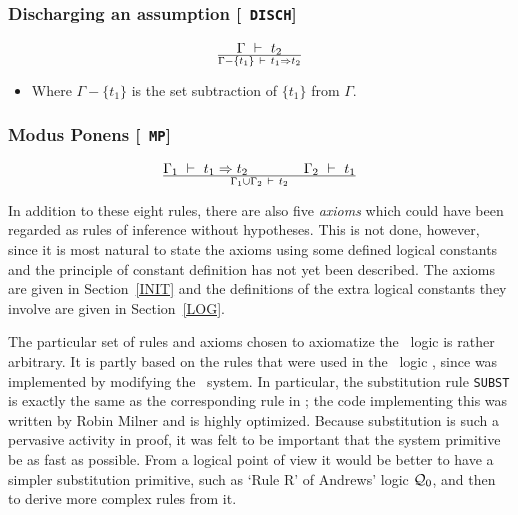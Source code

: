 \subsubsection*{Discharging an assumption [{\small\tt
DISCH}]}
\[
\Gamma\ \vdash\  t_2
\over
\Gamma -\{t_1\} \ \vdash\  t_1 \Rightarrow t_2
\]
\begin{itemize}
\item Where $\Gamma -\{t_1\}$ is the set subtraction of $\{t_1\}$
from $\Gamma$.
\end{itemize}

\subsubsection*{Modus Ponens [{\small\tt
MP}]}
\[
\Gamma_1 \ \vdash\  t_1 \Rightarrow t_2  \qquad\qquad   \Gamma_2\ \vdash\  t_1
\over
\Gamma_1 \cup \Gamma_2 \ \vdash\  t_2
\]

In addition to these eight rules, there are also five {\it
axioms\/} which could have been
regarded as rules of inference without hypotheses. This is not done,
however, since it is most natural to state the axioms using some
defined logical constants and the principle of constant definition has
not yet been described.  The axioms are given in Section~\ref{INIT} and
the definitions of the extra logical constants they involve are given in
Section~\ref{LOG}.

The particular set of rules and axioms chosen to axiomatize the \HOL\
logic is rather arbitrary. It is partly based on the rules that were
used in the
\LCF{}\ logic
\PPL{}, since \HOL{} was
implemented by modifying the \LCF\ system. In particular, the
substitution rule {\small\tt SUBST} is exactly
the same as the corresponding rule in \LCF; the code implementing this
was written by Robin Milner and is highly optimized. Because
substitution is such a pervasive activity in proof, it was felt to be
important that the system primitive be as fast as possible. From a
logical point of view it would be better to have a simpler
substitution primitive, such as `Rule R' of Andrews' logic ${\cal
Q}_0$, and then to derive more complex rules from it.

